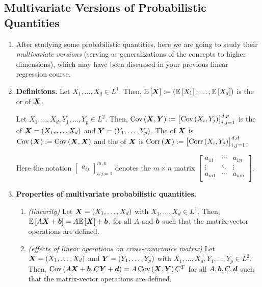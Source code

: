 \subsection{Multivariate Versions of Probabilistic Quantities}
\label{subsect:multivar-prob-quant}
\begin{enumerate}
\item After studying some probabilistic quantities, here we are going to study
their \emph{multivariate versions} (serving as generalizations of the concepts
to higher dimensions), which may have been discussed in your previous linear
regression course.
\item \textbf{Definitions.} Let \(X_1,\dotsc,X_d\in L^{1}\). Then,
\(\mathbb{E}\left[\bm{X}\right]:=(\mathbb{E}\left[X_1\right],\dotsc,\mathbb{E}\left[X_d\right])\) is the 
or  of \(\bm{X}\).

Let \(X_1,\dotsc,X_d,Y_1,\dotsc,Y_p\in L^{2}\). Then,
\(\operatorname{Cov}\left(\bm{X},\bm{Y}\right)
:=\begin{bmatrix}\operatorname{Cov}\left(X_i,Y_j\right)\end{bmatrix}_{i,j=1}^{d,p}\) is the
 of \(\bm{X}=(X_1,\dotsc,X_d)\) and
\(\bm{Y}=(Y_1,\dotsc,Y_p)\). The  of \(\bm{X}\) is
\(\operatorname{Cov}\left(\bm{X}\right):=\operatorname{Cov}\left(\bm{X},\bm{X}\right)\) and the  of \(\bm{X}\)
is \(\operatorname{Corr}\left(\bm{X}\right):=\begin{bmatrix}\operatorname{Corr}\left(X_i,Y_j\right)\end{bmatrix}_{i,j=1}^{d,d}\).
\begin{note}
Here the notation \(\begin{bmatrix}a_{ij}\end{bmatrix}_{i,j=1}^{m,n}\) denotes
the \(m\times n\) matrix \(\begin{bmatrix}
a_{11}&\cdots&a_{1n}\\
\vdots&\ddots&\vdots\\
a_{m1}&\cdots&a_{mn}\\
\end{bmatrix}\).
\end{note}
\item\label{it:mult-var-prob-quant-prop} \textbf{Properties of multivariate
probabilistic quantities.}
\begin{enumerate}
\item\label{it:mean-vec-linearity} \emph{(linearity)} Let \(\bm{X}=(X_1,\dotsc,X_d)\)
with \(X_1,\dotsc,X_d\in L^{1}\).
Then, \(\mathbb{E}\left[A\bm{X}+\bm{b}\right]=A\mathbb{E}\left[\bm{X}\right]+\bm{b}\), for all \(A\) and
\(\bm{b}\) such that the matrix-vector operations are defined.
\item\label{it:lin-cross-cov} \emph{(effects of linear operations on cross-covariance matrix)} Let
\(\bm{X}=(X_1,\dotsc,X_d)\) and \(\bm{Y}=(Y_1,\dotsc,Y_p)\) with
\(X_1,\dotsc,X_d,Y_1,\dotsc,Y_p\in L^{2}\). Then,
\(\operatorname{Cov}\left(A\bm{X}+\bm{b},C\bm{Y}+\bm{d}\right)=A\operatorname{Cov}\left(\bm{X},\bm{Y}\right)C^{T}\)
for all \(A,\bm{b},C,\bm{d}\) such that the matrix-vector operations are
defined.


\end{enumerate}
\end{enumerate}
